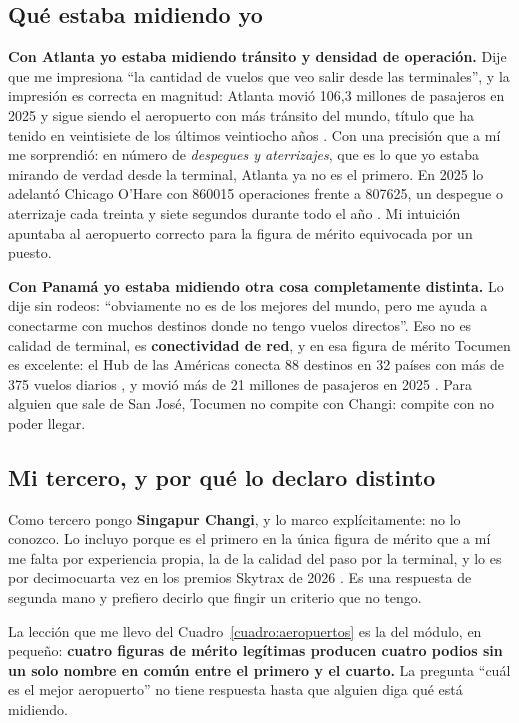 \documentclass[11pt,letterpaper]{article}
\begin{document}
\subsection*{Qué estaba midiendo yo}

\textbf{Con Atlanta yo estaba midiendo tránsito y densidad de operación.} Dije
que me impresiona \enquote{la cantidad de vuelos que veo salir desde las
terminales}, y la impresión es correcta en magnitud: Atlanta movió 106,3
millones de pasajeros en 2025 y sigue siendo el aeropuerto con más tránsito del
mundo, título que ha tenido en veintisiete de los últimos veintiocho años
\parencite{aci2026transito}. Con una precisión que a mí me sorprendió: en
número de \emph{despegues y aterrizajes}, que es lo que yo estaba mirando de
verdad desde la terminal, Atlanta ya no es el primero. En 2025 lo adelantó
Chicago O'Hare con \num{860015} operaciones frente a \num{807625}, un
despegue o aterrizaje cada treinta y siete segundos durante todo el año
\parencite{ohare2026}. Mi intuición apuntaba al aeropuerto correcto para la
figura de mérito equivocada por un puesto.

\textbf{Con Panamá yo estaba midiendo otra cosa completamente distinta.} Lo
dije sin rodeos: \enquote{obviamente no es de los mejores del mundo, pero me
ayuda a conectarme con muchos destinos donde no tengo vuelos directos}. Eso no
es calidad de terminal, es \textbf{conectividad de red}, y en esa figura de
mérito Tocumen es excelente: el Hub de las Américas conecta 88 destinos en 32
países con más de 375 vuelos diarios \parencite{copa2025}, y movió más de 21
millones de pasajeros en 2025 \parencite{tocumen2025}. Para alguien que sale
de San José, Tocumen no compite con Changi: compite con no poder llegar.

\subsection*{Mi tercero, y por qué lo declaro distinto}

Como tercero pongo \textbf{Singapur Changi}, y lo marco explícitamente: no lo
conozco. Lo incluyo porque es el primero en la única figura de mérito que a mí
me falta por experiencia propia, la de la calidad del paso por la terminal, y
lo es por decimocuarta vez en los premios Skytrax de 2026
\parencite{skytrax2026}. Es una respuesta de segunda mano y prefiero decirlo
que fingir un criterio que no tengo.

La lección que me llevo del Cuadro~\ref{cuadro:aeropuertos} es la del módulo,
en pequeño: \textbf{cuatro figuras de mérito legítimas producen cuatro podios
sin un solo nombre en común entre el primero y el cuarto.} La pregunta
\enquote{cuál es el mejor aeropuerto} no tiene respuesta hasta que alguien diga
qué está midiendo.
\end{document}
